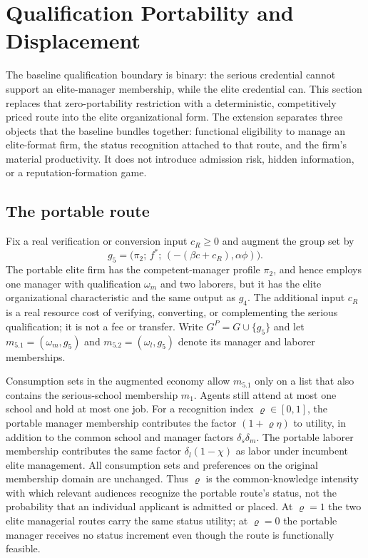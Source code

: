 \documentclass[12pt,letterpaper]{article}
\theoremstyle{definition}
\begin{document}
\section{Qualification Portability and Displacement}\label{sec:portability}

The baseline qualification boundary is binary: the serious credential cannot support an
elite-manager membership, while the elite credential can.
This section replaces that zero-portability restriction with a deterministic, competitively
priced route into the elite organizational form.
The extension separates three objects that the baseline bundles together:
functional eligibility to manage an elite-format firm, the status recognition attached to
that route, and the firm's material productivity.
It does not introduce admission risk, hidden information, or a reputation-formation game.

\subsection{The portable route}

Fix a real verification or conversion input $c_R\geq 0$ and augment the group set by
\begin{equation}\label{eq:portable-type}
  g_5
  =
  \big(\pi_2;\,f^\ast;\,(-(\beta c+c_R),\alpha\phi)\big).
\end{equation}
The portable elite firm has the competent-manager profile $\pi_2$, and hence employs one
manager with qualification $\omega_m$ and two laborers, but it has the elite organizational
characteristic and the same output as $g_4$.
The additional input $c_R$ is a real resource cost of verifying, converting, or
complementing the serious qualification; it is not a fee or transfer.
Write $G^P=G\cup\{g_5\}$ and let
$m_{5.1}=(\omega_m,g_5)$ and $m_{5.2}=(\omega_l,g_5)$ denote its manager and laborer
memberships.

Consumption sets in the augmented economy allow $m_{5.1}$ only on a list that also
contains the serious-school membership $m_1$.
Agents still attend at most one school and hold at most one job.
For a recognition index $\varrho\in[0,1]$, the portable manager membership contributes
the factor $(1+\varrho\eta)$ to utility, in addition to the common school and manager
factors $\delta_s\delta_m$.
The portable laborer membership contributes the same factor
$\delta_l(1-\chi)$ as labor under incumbent elite management.
All consumption sets and preferences on the original membership domain are unchanged.
Thus $\varrho$ is the common-knowledge intensity with which relevant audiences recognize
the portable route's status, not the probability that an individual applicant is admitted
or placed.
At $\varrho=1$ the two elite managerial routes carry the same status utility; at
$\varrho=0$ the portable manager receives no status increment even though the route is
functionally feasible.
\end{document}

